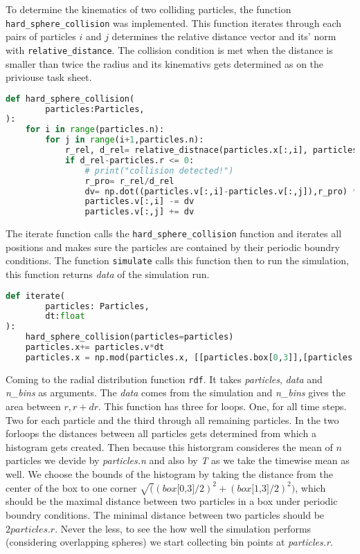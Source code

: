 \documentclass{article}[a4paper]
\begin{document}
To determine the kinematics of two colliding particles, the function \texttt{hard\_sphere\_collision} was implemented. 
This function iterates through each pairs of particles $i$ and $j$ determines the relative distance vector and its' norm with \texttt{relative\_distance}. 
The collision condition is met when the distance is smaller than twice the radius and its kinemativs gets determined as on the priviouse task sheet. 
\begin{lstlisting}[language=Python]
def hard_sphere_collision(
        particles:Particles,
):
    for i in range(particles.n):
        for j in range(i+1,particles.n):
            r_rel, d_rel= relative_distnace(particles.x[:,i], particles.x[:,j],particles.box) 
            if d_rel-particles.r <= 0:
                # print("collision detected!")
                r_pro= r_rel/d_rel
                dv= np.dot((particles.v[:,i]-particles.v[:,j]),r_pro) * r_pro
                particles.v[:,i] -= dv
                particles.v[:,j] += dv
\end{lstlisting}

The iterate function calls the \texttt{hard\_sphere\_collision} function and iterates all positions and makes sure the particles are contained by their periodic boundry conditions. The function \texttt{simulate} calls this function then to run the simulation, this function returns \textit{data} of the simulation run.
\begin{lstlisting}[language=Python]
def iterate(
        particles: Particles,
        dt:float
):
    hard_sphere_collision(particles=particles)
    particles.x+= particles.v*dt  
    particles.x = np.mod(particles.x, [[particles.box[0,3]],[particles.box[1,3]]]) 
\end{lstlisting}

Coming to the radial distribution function \texttt{rdf}. 
It takes \textit{particles}, \textit{data} and \textit{n\_bins} as arguments. 
The \textit{data} comes from the simulation and \textit{n\_bins} gives the area between $r, r+dr$. 
This function has three for loops. 
One, for all time steps. 
Two for each particle and the third through all remaining particles.
In the two forloops the distances between all particles gets determined from which a histogram gets created. 
Then because this historgram consideres the mean of $n$ particles we devide by \textit{particles.n} and also by \textit{T} as we take the timewise mean as well. 
We choose the bounds of the histogram by taking the distance from the center of the box to one corner $\sqrt((\textit{box[0,3]}/2)^2+(\textit{box[1,3]}/2)^2)$, which should be the maximal distance between two particles in a box under periodic boundry conditions.
The minimal distance between two particles should be $2\textit{particles.r}$.
Never the less, to see the how well the simulation performs (considering overlapping spheres) we start collecting bin points at \textit{particles.r}.
\end{document}
